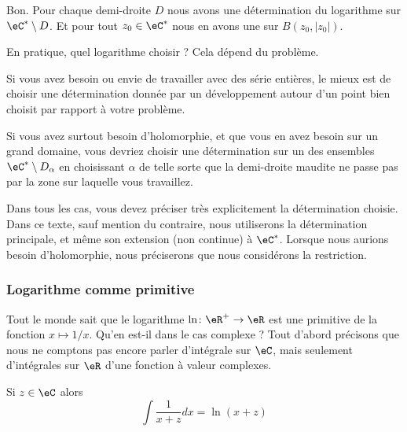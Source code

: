 Bon. Pour chaque demi-droite \( D\) nous avons une détermination du logarithme sur \( \eC^*\setminus D\). Et pour tout \( z_0\in \eC^*\) nous en avons une sur \( B(z_0,| z_0 |)\).

En pratique, quel logarithme choisir ? Cela dépend du problème. 

Si vous avez besoin ou envie de travailler avec des série entières, le mieux est de choisir une détermination donnée par un développement autour d'un point bien choisit par rapport à votre problème.

Si vous avez surtout besoin d'holomorphie, et que vous en avez besoin sur un grand domaine, vous devriez choisir une détermination sur un des ensembles \( \eC^*\setminus D_{\alpha}\) en choisissant \( \alpha\) de telle sorte que la demi-droite maudite ne passe pas par la zone sur laquelle vous travaillez.

Dans tous les cas, vous devez préciser très explicitement la détermination choisie. Dans ce texte, sauf mention du contraire, nous utiliserons la détermination principale, et même son extension (non continue) à \( \eC^*\). Lorsque nous aurions besoin d'holomorphie, nous préciserons que nous considérons la restriction.

\subsubsection{Logarithme comme primitive}

Tout le monde sait que le logarithme \( \ln\colon \eR^+\to \eR\) est une primitive de la fonction \( x\mapsto 1/x\). Qu'en est-il dans le cas complexe ? Tout d'abord précisons que nous ne comptons pas encore parler d'intégrale sur \( \eC\), mais seulement d'intégrales sur \( \eR\) d'une fonction à valeur complexes.

\begin{proposition}     \label{PROPooNIJVooKueuYJ}
    Si \( z\in \eC\) alors
    \begin{equation}        \label{EQooAHYXooTPGXDS}
        \int\frac{1}{ x+z }dx=\ln(x+z)
    \end{equation}
\end{proposition}


